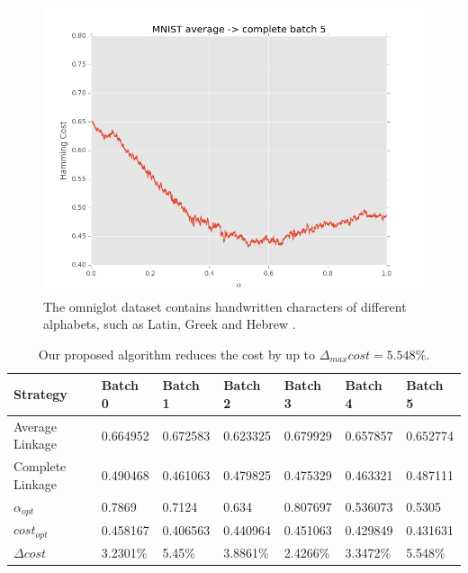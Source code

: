 \begin{figure}[h]
\begin{minipage}{.3\textwidth}
\end{minipage}
\begin{minipage}{.3\textwidth}
  \centering
  \includegraphics[width=\linewidth]{images/mnist-ac-5}
\end{minipage}
\caption{The omniglot dataset contains handwritten characters of different alphabets, such as Latin, Greek and Hebrew \cite{Lake1332}.}
\label{fig:mnist1000ac}
\end{figure}

\begin{table}[h]
    \centering
    \begin{tabular}{|l | l l l l l l |}
    \hline
    Strategy & Batch 0 & Batch 1 & Batch 2 & Batch 3 & Batch 4 & Batch 5\\ \hline
    Average Linkage & 0.664952 & 0.672583 & 0.623325 & 0.679929 & 0.657857 & 0.652774\\
    Complete Linkage & 0.490468 & 0.461063 & 0.479825 & 0.475329 & 0.463321 & 0.487111\\
    $\alpha_{opt}$ & 0.7869 & 0.7124 & 0.634 & 0.807697 & 0.536073 & 0.5305\\
    $cost_{opt}$ & 0.458167 & 0.406563 & 0.440964 & 0.451063 & 0.429849 & 0.431631\\
    $\Delta cost$ & 3.2301\% & 5.45\% & 3.8861\% & 2.4266\% & 3.3472\% & 5.548\%\\\hline
    \end{tabular}
    \caption{Our proposed algorithm reduces the cost by up to $\Delta_{max} cost = 5.548\%$.}
    \label{table:mnist1000ac}
\end{table}

